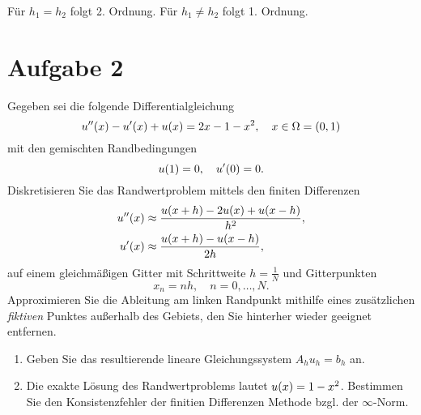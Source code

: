 \documentclass{exercise}
\begin{document}
    Für \(h_1 = h_2\) folgt 2. Ordnung.
    Für \(h_1 \ne h_2\) folgt 1. Ordnung.
    
    
    \section*{Aufgabe 2}
    
    \begin{problem}
        Gegeben sei die folgende Differentialgleichung
        \[
            u''\parentheses*{x} - u'\parentheses*{x} + u\parentheses*{x} = 2x - 1 - x^2, \quad x \in \Omega = \parentheses*{0, 1}
        \]
        mit den gemischten Randbedingungen
        \[
            u\parentheses*{1} = 0, \quad u'\parentheses*{0} = 0.
        \]
        Diskretisieren Sie das Randwertproblem mittels den finiten Differenzen
        \begin{align*}
            u''\parentheses*{x} &\approx \frac{u\parentheses*{x + h} - 2u\parentheses*{x} + u\parentheses*{x - h}}{h^2},\\
            u'\parentheses*{x} &\approx \frac{u\parentheses*{x + h} - u\parentheses*{x - h}}{2h},
        \end{align*}
        auf einem gleichmäßigen Gitter mit Schrittweite \(h = \frac{1}{N}\) und Gitterpunkten
        \[
            x_n = nh, \quad n = 0, \ldots, N.
        \]
        Approximieren Sie die Ableitung am linken Randpunkt mithilfe eines zusätzlichen \emph{fiktiven} Punktes außerhalb des Gebiets, den Sie hinterher wieder geeignet entfernen.
        \begin{enumerate}
            \item Geben Sie das resultierende lineare Gleichungssystem \(A_h u_h = b_h\) an.
            \item Die exakte Lösung des Randwertproblems lautet \(u\parentheses*{x} = 1 - x^2\).
            Bestimmen Sie den Konsistenzfehler der finitien Differenzen Methode bzgl. der \(\infty\)-Norm.
        \end{enumerate}
    \end{problem}
    
\end{document}
